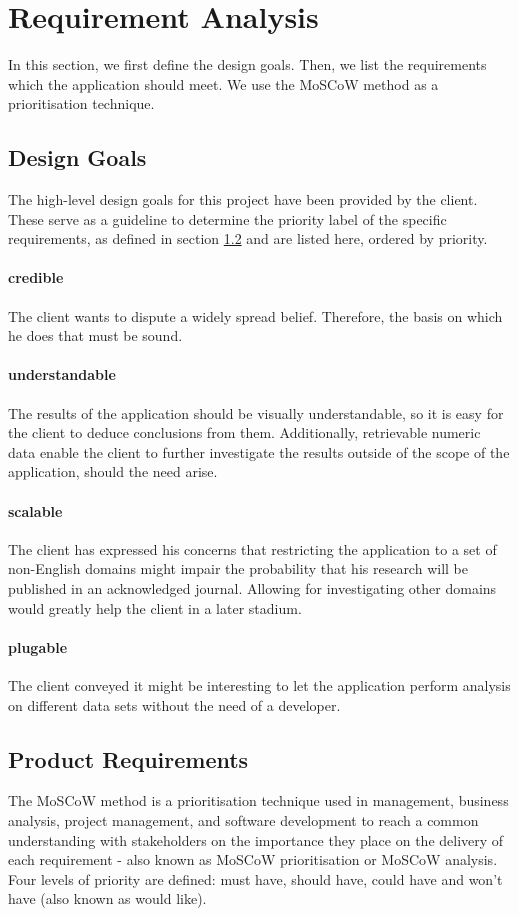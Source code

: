 \section {Requirement Analysis}
In this section, we first define the design goals. Then, we list the requirements which the application should meet. We use the MoSCoW method\cite{clegg1994case} as a prioritisation technique.

\subsection{Design Goals}
The high-level design goals for this project have been provided by the client. These serve as a guideline to determine the priority label of the specific requirements, as defined in section \ref{sec:reqs} and are listed here, ordered by priority.

\paragraph{credible} The client wants to dispute a widely spread belief. Therefore, the basis on which he does that must be sound.
\paragraph{understandable} The results of the application should be visually understandable, so it is easy for the client to deduce conclusions from them. Additionally, retrievable numeric data enable the client to further investigate the results outside of the scope of the application, should the need arise.
\paragraph{scalable} The client has expressed his concerns that restricting the application to a set of non-English domains might impair the probability that his research will be published in an acknowledged journal. Allowing for investigating other domains would greatly help the client in a later stadium.
\paragraph{plugable} The client conveyed it might be interesting to let the application perform analysis on different data sets without the need of a developer. 

\subsection{Product Requirements}\label{sec:reqs}
The MoSCoW method is a prioritisation technique used in management, business analysis, project management, and software development to reach a common understanding with stakeholders on the importance they place on the delivery of each requirement - also known as MoSCoW prioritisation or MoSCoW analysis. Four levels of priority are defined: must have, should have, could have and won't have (also known as would like).

